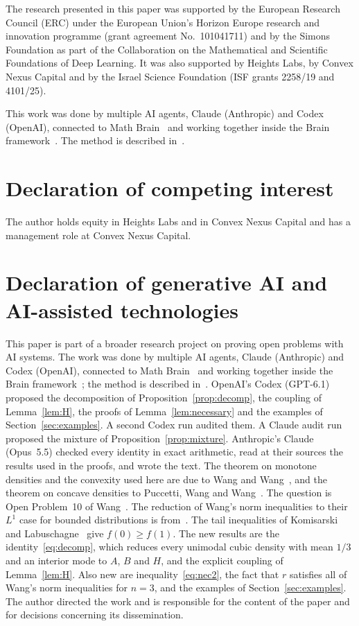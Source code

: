 \documentclass[11pt]{amsart}
\theoremstyle{remark}
\numberwithin{equation}{section}
\begin{document}
The research presented in this paper was supported by the European Research Council (ERC) under the European Union's Horizon Europe research and innovation programme (grant agreement No.~101041711) and by the Simons Foundation as part of the Collaboration on the Mathematical and Scientific Foundations of Deep Learning. It was also supported by Heights Labs, by Convex Nexus Capital and by the Israel Science Foundation (ISF grants 2258/19 and 4101/25).

This work was done by multiple AI agents, Claude (Anthropic) and Codex (OpenAI), connected to Math Brain~\cite{MathBrainRepo} and working together inside the Brain framework~\cite{BrainFramework}. The method is described in~\cite{MathBrainPaper}.

\section*{Declaration of competing interest}

The author holds equity in Heights Labs and in Convex Nexus Capital and has a management role at Convex Nexus Capital.

\section*{Declaration of generative AI and AI-assisted technologies}

This paper is part of a broader research project on proving open problems with AI systems. The work was done by multiple AI agents, Claude (Anthropic) and Codex (OpenAI), connected to Math Brain~\cite{MathBrainRepo} and working together inside the Brain framework~\cite{BrainFramework}; the method is described in~\cite{MathBrainPaper}. OpenAI's Codex (GPT-6.1) proposed the decomposition of Proposition~\ref{prop:decomp}, the coupling of Lemma~\ref{lem:H}, the proofs of Lemma~\ref{lem:necessary} and the examples of Section~\ref{sec:examples}. A second Codex run audited them. A Claude audit run proposed the mixture of Proposition~\ref{prop:mixture}. Anthropic's Claude (Opus~5.5) checked every identity in exact arithmetic, read at their sources the results used in the proofs, and wrote the text. The theorem on monotone densities and the convexity used here are due to Wang and Wang~\cite{WW11}, and the theorem on concave densities to Puccetti, Wang and Wang~\cite{PWW12}. The question is Open Problem~10 of Wang~\cite{Wan15}. The reduction of Wang's norm inequalities to their $L^1$ case for bounded distributions is from~\cite[Proposition~3.1]{Shm26}. The tail inequalities of Komisarski and Labuschagne~\cite[Corollary~2]{KL24} give $f(0)\ge f(1)$. The new results are the identity~\eqref{eq:decomp}, which reduces every unimodal cubic density with mean $1/3$ and an interior mode to $A$, $B$ and $H$, and the explicit coupling of Lemma~\ref{lem:H}. Also new are inequality~\eqref{eq:nec2}, the fact that $r$ satisfies all of Wang's norm inequalities for $n=3$, and the examples of Section~\ref{sec:examples}. The author directed the work and is responsible for the content of the paper and for decisions concerning its dissemination.
\end{document}
